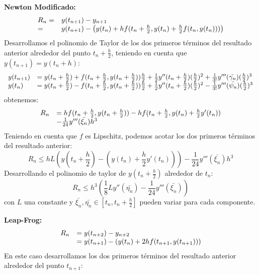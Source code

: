 \vspace{5mm}
\noindent\textbf{Newton Modificado:}
\begin{equation*}
\begin{array}{l l}
R_n = & y(t_{n+1}) - y_{n+1} \\
    = & y(t_{n+1}) - \left( y(t_n) + hf(t_n+\frac{h}{2},y(t_n)+\frac{h}{2}f(t_n,y(t_n)))\right)\\
\end{array}
\end{equation*}
Desarrollamos el polinomio de Taylor de los dos primeros términos del resultado anterior alrededor del punto $t_n+\frac{h}{2}$, teniendo en cuenta que $y(t_{n+1}) = y(t_n+h)$: 
\begin{equation*}
\begin{array}{l l}
y(t_{n+1}) & = y(t_n+\frac{h}{2}) + f(t_n+\frac{h}{2}, y(t_n+\frac{h}{2}))\frac{h}{2}+\frac{1}{2}y''(t_n+\frac{h}{2})(\frac{h}{2})^2 + \frac{1}{3!}y'''(\bar{\gamma_n})(\frac{h}{2})^3\\
y(t_{n}) & = y(t_n+\frac{h}{2}) - f(t_n+\frac{h}{2}, y(t_n+\frac{h}{2}))\frac{h}{2}+\frac{1}{2}y''(t_n+\frac{h}{2})(\frac{h}{2})^2 - \frac{1}{3!}y'''(\bar{\psi_n})(\frac{h}{2})^3
\end{array}
\end{equation*}
obtenemos: 
\begin{equation*}
\begin{array}{l l}
R_n & = hf(t_n+\frac{h}{2}, y(t_n+\frac{h}{2}))-hf(t_n+\frac{h}{2}, y(t_n)+\frac{h}{2}y'(t_n))\\
  & - \frac{1}{24}y'''(\bar{\xi_n})h^3
\end{array}
\end{equation*}
Teniendo en cuenta que $f$ es Lipschitz, podemos acotar los dos primeros términos del resultado anterior:
$$R_n \le hL(y(t_n+\frac{h}{2})-(y(t_n)+\frac{h}{2}y'(t_n))) - \frac{1}{24}y'''(\bar{\xi_n})h^3$$
Desarrollando el polinomio de taylor de $y(t_n+\frac{h}{2})$ alrededor de $t_n$:
$$R_n \le h^3\left(\frac{1}{8}Ly''(\bar{\eta_n})-\frac{1}{24}y'''(\bar{\xi_n})\right)$$
con $L$ una constante y $\bar{\xi_n}, \bar{\eta_n} \in [t_n, t_{n}+\frac{h}{2}]$ pueden variar para cada componente.

\vspace{5mm}
\noindent\textbf{Leap-Frog:}
\begin{equation*}
\begin{array}{l l}
R_n & = y(t_{n+2}) - y_{n+2} \\
    & = y(t_{n+1}) - \left( y(t_n) + 2hf(t_{n+1}, y(t_{n+1}))\right)\\
\end{array}
\end{equation*}
En este caso desarrollamos los dos primeros términos del resultado anterior alrededor del punto $t_{n+1}$:

